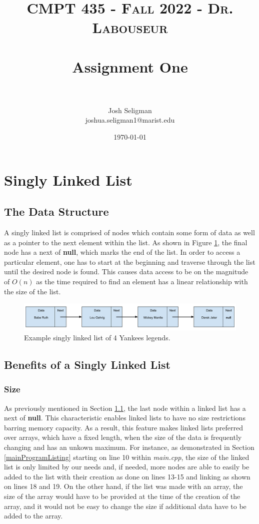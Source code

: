 \documentclass[letterpaper, 10pt,DIV=13]{scrartcl}
\title{	
   \normalfont \normalsize 
   \textsc{CMPT 435 - Fall 2022 - Dr. Labouseur} \\[10pt] %
   \horrule{0.5pt} \\[0.25cm] 	%
   \huge Assignment One  \\     	    %
   \horrule{0.5pt} \\[0.25cm] 	%
}
\author{Josh Seligman \\ \normalsize joshua.seligman1@marist.edu}
\date{\normalsize\today} 	%
\numberwithin{equation}{section} %
\numberwithin{figure}{section} %
\numberwithin{table}{section} %
\begin{document}
\maketitle %

\section{Singly Linked List}\label{linkedListSection}
\subsection{The Data Structure}\label{linkedListDataStructure}
A singly linked list is comprised of nodes which contain some form of data as well as a pointer to the next element within the list. As shown in 
Figure \ref{figure:linkedList}, the final node has a next of \textbf{null}, which marks the end of the list. In order to access a particular element,
one has to start at the beginning and traverse through the list until the desired node is found. This causes data access to be on the magnitude of $O(n)$ as the time required
to find an element has a linear relationship with the size of the list.

\begin{figure}[ht] 
    \centering 
    \includegraphics[width=15cm]{linkedList}
    \caption{Example singly linked list of 4 Yankees legends.}
    \label{figure:linkedList}
 \end{figure}

\subsection{Benefits of a Singly Linked List}
\subsubsection{Size}
As previously mentioned in Section \ref{linkedListDataStructure}, the last node within a linked list has a next of \textbf{null}. This characteristic enables linked lists to have no size restrictions barring memory capacity.
As a result, this feature makes linked lists preferred over arrays, which have a fixed length, when the size of the data is frequently changing and has an unkown maximum. For instance, as demonstrated in
Section \ref{mainProgramListing} starting on line 10 within \textit{main.cpp}, the size of the linked list is only limited by our needs and, if needed, more nodes are able
to easily be added to the list with their creation as done on lines 13-15 and linking as shown on lines 18 and 19. On the other hand, if the list was made with an array,
the size of the array would have to be provided at the time of the creation of the array, and it would not be easy to change the size if additional data have to be added
to the array.
\end{document}
